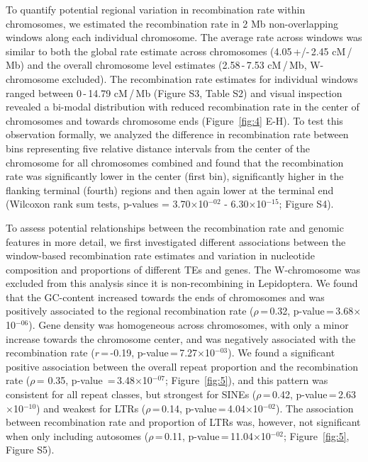 \documentclass[twocolumn]{bmcart}%
\begin{document}
To quantify potential regional variation in recombination rate within chromosomes, we estimated the recombination rate in 2 Mb non-overlapping windows along each individual chromosome. The average rate across windows was similar to both the global rate estimate across chromosomes (4.05\,+/-\,2.45 cM\,/\,Mb) and the overall chromosome level estimates (2.58\,-\,7.53 cM\,/\,Mb, W-chromosome excluded). The recombination rate estimates for individual windows ranged between 0\,-\,14.79 cM\,/\,Mb (Figure S3, Table S2) and visual inspection revealed a bi-modal distribution with reduced recombination rate in the center of chromosomes and towards chromosome ends (Figure~\ref{fig:4} E-H). To test this observation formally, we analyzed the difference in recombination rate between bins representing five relative distance intervals from the center of the chromosome for all chromosomes combined and found that the recombination rate was significantly lower in the center (first bin), significantly higher in the flanking terminal (fourth) regions and then again lower at the terminal end (Wilcoxon rank sum tests, p-values = 3.70$\times$10$^{-02}$ - 6.30$\times$10$^{-15}$; Figure S4).

To assess potential relationships between the recombination rate and genomic features in more detail, we first investigated different associations between the window-based recombination rate estimates and variation in nucleotide composition and proportions of different TEs and genes. The W-chromosome was excluded from this analysis since it is non-recombining in Lepidoptera. We found that the GC-content increased towards the ends of chromosomes and was positively associated to the regional recombination rate ($\rho$\,=\,0.32, p-value\,=\,3.68$\times$10$^{-06}$). Gene density was homogeneous across chromosomes, with only a minor increase towards the chromosome center, and was negatively associated with the recombination rate ($r$\,=\,-0.19, p-value\,=\,7.27$\times$10$^{-03}$). We found a significant positive association between the overall repeat proportion and the recombination rate ($\rho$\,= 0.35, p-value \,=\,3.48$\times$10$^{-07}$; Figure~\ref{fig:5}), and this pattern was consistent for all repeat classes, but strongest for SINEs ($\rho$\,=\,0.42, p-value\,=\,2.63$\times$10$^{-10}$) and weakest for LTRs ($\rho$\,=\,0.14, p-value\,=\,4.04$\times$10$^{-02}$). The association between recombination rate and proportion of LTRs was, however, not significant when only including autosomes ($\rho$\,=\,0.11, p-value\,=\,11.04$\times$10$^{-02}$; Figure~\ref{fig:5}, Figure S5).
\end{document}
